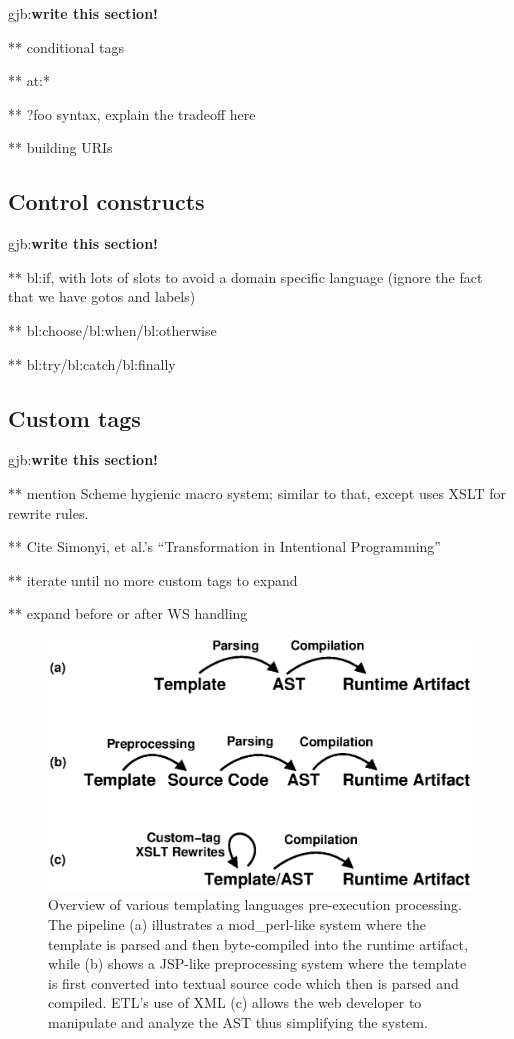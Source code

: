 \documentclass{www2003-submission}
\newcommand{\gjb}[1]{{\sc gjb:}\textbf{#1}}
\begin{document}
\gjb{write this section!}

** conditional tags

** at:*

** ?foo syntax, explain the tradeoff here

** building URIs

\subsection{Control constructs}
\label{ssec-control}

\gjb{write this section!}

** bl:if, with lots of slots to avoid a domain specific language
(ignore the fact that we have gotos and labels)

** bl:choose/bl:when/bl:otherwise

** bl:try/bl:catch/bl:finally

\subsection{Custom tags}
\label{ssec-custom-tags}

\gjb{write this section!}

** mention Scheme hygienic macro system; similar to that, except uses
XSLT for rewrite rules.

** Cite Simonyi, et al.'s ``Transformation in Intentional Programming''

** iterate until no more custom tags to expand

** expand before or after WS handling



\begin{figure}[tb]
\begin{centering}
\includegraphics[width=1\linewidth]{processing-stages-simple.eps}
\caption{Overview of various templating languages pre-execution
processing.  The pipeline (a) illustrates a mod\_perl-like system where
the template is parsed and then byte-compiled into the runtime
artifact, while (b) shows a JSP-like preprocessing system where the
template is first converted into textual source code which then is
parsed and compiled.  ETL's use of XML (c) allows the web developer to
manipulate and analyze the AST thus simplifying the system.
\label{fig-processing-stages}}
\end{centering}
\end{figure}
\end{document}
